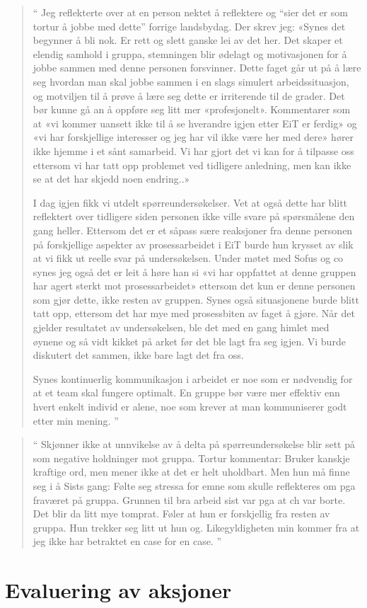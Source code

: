 \begin{quote}``
Jeg reflekterte over at en person nektet å reflektere og “sier det er som tortur å jobbe med dette” forrige 
landsbydag.  Der skrev jeg: «Synes det begynner å bli nok. Er rett og slett ganske lei av det her. Det skaper et 
elendig samhold i gruppa, stemningen blir ødelagt og motivasjonen for å jobbe sammen med denne personen 
forsvinner. Dette faget går ut på å lære seg hvordan man skal jobbe sammen i en slags simulert arbeidssituasjon, 
og motviljen til å prøve å lære seg dette er irriterende til de grader. Det bør kunne gå an å oppføre seg litt mer 
«profesjonelt». Kommentarer som at «vi kommer uansett ikke til å se hverandre igjen etter EiT er ferdig» og «vi har 
forskjellige interesser og jeg har vil ikke være her med dere» hører ikke hjemme i et sånt samarbeid. Vi har gjort det 
vi kan for å tilpasse oss ettersom vi har tatt opp problemet ved tidligere anledning, men kan ikke se at det har 
skjedd noen endring..»

I dag igjen fikk vi utdelt spørreundersøkelser. Vet at også dette har blitt reflektert over tidligere siden personen ikke 
ville svare på spørsmålene den gang heller. Ettersom det er et såpass sære reaksjoner fra denne personen på 
forskjellige aspekter av prosessarbeidet i EiT burde hun krysset av slik at vi fikk ut reelle svar på undersøkelsen. 
Under møtet med Sofus og co synes jeg også det er leit å høre han si «vi har oppfattet at denne gruppen har agert 
sterkt mot prosessarbeidet» ettersom det kun er denne personen som gjør dette, ikke resten av gruppen. Synes 
også situasjonene burde blitt tatt opp, ettersom det har mye med prosessbiten av faget å gjøre. Når det gjelder 
resultatet av undersøkelsen, ble det med en gang himlet med øynene og så vidt kikket på arket før det ble lagt fra 
seg igjen. Vi burde diskutert det sammen, ikke bare lagt det fra oss.

Synes kontinuerlig kommunikasjon i arbeidet er noe som er nødvendig for at et team skal fungere optimalt. En 
gruppe bør være mer effektiv enn hvert enkelt individ er alene, noe som krever at man kommuniserer godt etter min 
mening.
''\end{quote} 

\begin{quote}``
Skjønner ikke at unnvikelse av å delta på spørreundersøkelse blir sett på som negative holdninger mot gruppa. 
Tortur kommentar: Bruker kanskje kraftige ord, men mener ikke at det er helt uholdbart. Men hun må finne seg i å 
Sists gang: Følte seg stressa for emne som skulle reflekteres om pga fraværet på gruppa. 
Grunnen til bra arbeid sist var pga at ch var borte. Det blir da litt mye tomprat. 
Føler at hun er forskjellig fra resten av gruppa. Hun trekker seg litt ut hun og. 
Likegyldigheten min kommer fra at jeg ikke har betraktet en case for en case. 
''\end{quote} 

\section{Evaluering av aksjoner}
